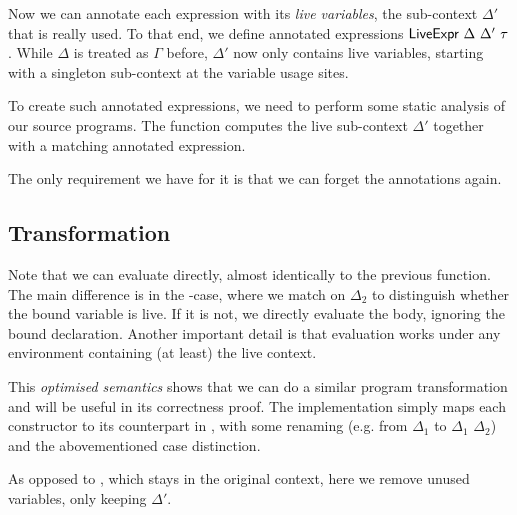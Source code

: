 \documentclass[11pt,a4paper]{article}
\newcommand{\AgdaFloor}[1]{\AgdaFunction{$\lfloor$}\AgdaSpace{}#1\AgdaSpace{}\AgdaFunction{$\rfloor$}}
\begin{document}
Now we can annotate each expression with its \emph{live variables},
the sub-context $\Delta'$ that is really used.
To that end, we define annotated expressions
$\AgdaDatatype{LiveExpr}\ \Delta\ \Delta'\ \tau$.
While $\Delta$ is treated as $\Gamma$ before, $\Delta'$ now only contains live variables,
starting with a singleton sub-context at the variable usage sites.

\CodeLiveExpr

To create such annotated expressions, we need to perform
some static analysis of our source programs.
The function  computes the live sub-context $\Delta'$
together with a matching annotated expression.

\CodeLiveAnalyse

The only requirement we have for it is that we can forget the annotations again.

\CodeLiveForgetSignature

\CodeLiveAnalysePreservesSignature


\subsection{Transformation}

Note that we can evaluate  directly,
almost identically to the previous  function.
The main difference is in the -case,
where we match on $\Delta_2$ to distinguish whether the bound variable is live.
If it is not, we directly evaluate the body, ignoring the bound declaration.
Another important detail is that evaluation works under any environment containing (at least) the live context.

\CodeLiveEvalLive

This \emph{optimised semantics} shows that we can do a similar program transformation
and will be useful in its correctness proof.
The implementation simply maps each constructor to its counterpart in ,
with some renaming
(e.g. from \AgdaFloor{$\Delta_1$} to \AgdaFloor{$\Delta_1$ \AgdaFunction{$\cup$} $\Delta_2$})
and the abovementioned case distinction.

\CodeLiveDbe
\CodeLiveRestrictedRefSignature

As opposed to , which stays in the original context,
here we remove unused variables, only keeping \AgdaFloor{$\Delta'$}.
\end{document}
